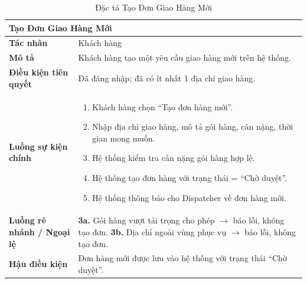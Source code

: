 \begin{table}[H]
  \centering
  \begin{tabularx}{\textwidth}{|l|X|}
    \hline
    \multicolumn{2}{|l|}{\textbf{Tạo Đơn Giao Hàng Mới}} \\
    \hline
    \textbf{Tác nhân}           & Khách hàng \\ \hline
    \textbf{Mô tả}              & Khách hàng tạo một yêu cầu giao hàng mới trên hệ thống. \\ \hline
    \textbf{Điều kiện tiên quyết} & Đã đăng nhập; đã có ít nhất 1 địa chỉ giao hàng. \\ \hline
    \textbf{Luồng sự kiện chính} &
      \begin{enumerate}[leftmargin=*, nosep, topsep=0pt]
        \item Khách hàng chọn ``Tạo đơn hàng mới''.
        \item Nhập địa chỉ giao hàng, mô tả gói hàng, cân nặng, thời gian mong muốn.
        \item Hệ thống kiểm tra cân nặng gói hàng hợp lệ.
        \item Hệ thống tạo đơn hàng với trạng thái = ``Chờ duyệt''.
        \item Hệ thống thông báo cho Dispatcher về đơn hàng mới.
      \end{enumerate} \\ \hline
    \textbf{Luồng rẽ nhánh / Ngoại lệ} &
      \textbf{3a.} Gói hàng vượt tải trọng cho phép $\rightarrow$ báo lỗi, không tạo đơn.
      \newline
      \textbf{3b.} Địa chỉ ngoài vùng phục vụ $\rightarrow$ báo lỗi, không tạo đơn. \\ \hline
    \textbf{Hậu điều kiện}      & Đơn hàng mới được lưu vào hệ thống với trạng thái ``Chờ duyệt''. \\
    \hline
  \end{tabularx}
  \caption{Đặc tả Tạo Đơn Giao Hàng Mới}
  \label{tab:uc02}
\end{table}

